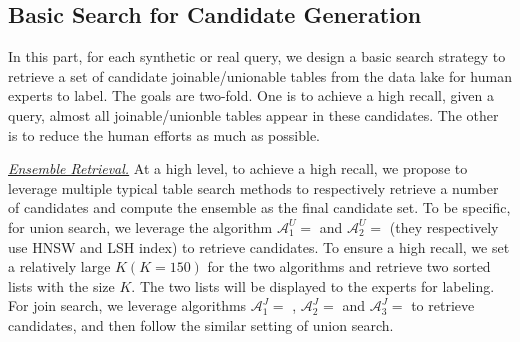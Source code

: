 %


 



\subsection{Basic Search for Candidate Generation}
In this part, for each synthetic or real query, we design a basic search strategy to retrieve a set of  candidate joinable/unionable tables from the data lake for human experts to label. The goals are two-fold. One is to achieve a high recall, \ie given a query, almost all joinable/unionble tables appear in these candidates. The other is to reduce the human efforts as much as possible.

\noindent \underline{\textit{Ensemble Retrieval.}}
At a high level, to achieve a high recall, we propose to leverage multiple typical table search methods to respectively retrieve a number of candidates and compute the ensemble as the final candidate set.  
%
To be specific, for union search, we leverage the algorithm $\mathcal{A}^U_1=$ \starmie and $\mathcal{A}^U_2=$ \dlll (they respectively use HNSW and LSH index) to retrieve candidates.
 To ensure a high recall, we set a relatively large $K   (K=150)$ for the two algorithms and retrieve two sorted lists with the size $K$.
 The two lists will be displayed to the experts for labeling. 
%
For join search, we leverage algorithms $\mathcal{A}^J_1=$ \josie, $\mathcal{A}^J_2=$ \deepjoin and $\mathcal{A}^J_3=$ \starmie {} to retrieve candidates, and then follow the similar setting of union search.


